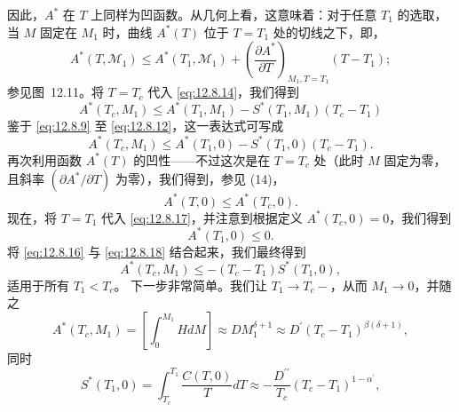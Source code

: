 因此，\(A^*\) 在 \(T\) 上同样为凹函数。从几何上看，这意味着：对于任意 \(T_1\) 的选取，当 \(M\) 固定在 \(M_1\) 时，曲线 \(A^*(T)\) 位于 \(T = T_1\) 处的切线之下，即，
\begin{equation}\tag{12.8.14}\label{eq:12.8.14}
A ^{*} ( T , \mathcal { M } _ { 1 } ) \leq A ^{*} ( T _ { 1 } , \mathcal { M } _ { 1 } ) + \left( \frac { \partial A ^{*} } { \partial T } \right) _ { M _ { 1 } , T = T _ { 1 } } ( T - T _ { 1 } ) ;
\end{equation}
参见图~12.11。将 \(T = T_c\) 代入 \autoref{eq:12.8.14}，我们得到
\begin{equation}\tag{12.8.15}\label{eq:12.8.15}
A ^{*} ( T _ { c } , M _ { 1 } ) \leq A ^{*} ( T _ { 1 } , M _ { 1 } ) - S ^{*} ( T _ { 1 } , M _ { 1 } ) ( T _ { c } - T _ { 1 } )
\end{equation}
鉴于 \autoref{eq:12.8.9} 至 \autoref{eq:12.8.12}，这一表达式可写成
\begin{equation}\tag{12.8.16}\label{eq:12.8.16}
A ^{*} ( T _ { c } , M _ { 1 } ) \leq A ^{*} ( T _ { 1 } , 0 ) - S ^{*} ( T _ { 1 } , 0 ) ( T _ { c } - T _ { 1 } ) .
\end{equation}
再次利用函数 \(A^{*}(T)\) 的凹性——不过这次是在 \(T = T_{c}\) 处（此时 \(M\) 固定为零，且斜率 \((\partial A^{*}/\partial T)\) 为零），我们得到，参见 (14)，
\begin{equation}\tag{12.8.17}\label{eq:12.8.17}
A ^{*} ( T , 0 ) \leq A ^{*} ( T _ { c } , 0 ) .
\end{equation}
现在，将 \(T = T_{1}\) 代入 \autoref{eq:12.8.17}，并注意到根据定义 \(A^{*}(T_{c},0)=0\)，我们得到
\begin{equation}\tag{12.8.18}\label{eq:12.8.18}
A ^{*} ( T _ { 1 } , 0 ) \leq 0 .
\end{equation}
将 \autoref{eq:12.8.16} 与 \autoref{eq:12.8.18} 结合起来，我们最终得到
\begin{equation}\tag{12.8.19}\label{eq:12.8.19}
A ^{*} ( T _ { c } , M _ { 1 } ) \leq - ( T _ { c } - T _ { 1 } ) S ^{*} ( T _ { 1 } , 0 ) ,
\end{equation}
适用于所有 \(T_{1} < T_{c}\)。
下一步非常简单。我们让 \(T_1 \rightarrow T_c-\)，从而 \(M_1 \rightarrow 0\)，并随之
\begin{equation}\tag{12.8.20}\label{eq:12.8.20}
A ^{*} ( T _ { c } , M _ { 1 } ) = \left[ \int _ { 0 } ^{M _ { 1} } H d M \right] \approx D M _ { 1 } ^{\delta + 1} \approx D ^{\prime} ( T _ { c } - T _ { 1 } ) ^{\beta ( \delta + 1 )} ,
\end{equation}
同时
\begin{equation}\tag{12.8.21}\label{eq:12.8.21}
S ^{*} ( T _ { 1 } , 0 ) = \int _ { T _ { c } } ^{T _ { 1} } \frac { C ( T , 0 ) } { T } d T \approx - \frac { D ^{\prime \prime} } { T _ { c } } ( T _ { c } - T _ { 1 } ) ^{1 - \alpha ^ { \prime} } ,
\end{equation}
